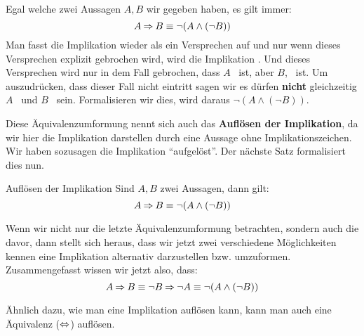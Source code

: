 \documentclass[../../main.tex]{subfiles}
\begin{document}
    Egal welche zwei Aussagen $A,B$ wir 
    gegeben haben, es gilt immer:
    \[A \mathbin{\Rightarrow} B \equiv \lnot (A \land (\lnot B))\] 
    Man fasst die Implikation wieder als 
    ein Versprechen auf und nur wenn dieses Versprechen explizit gebrochen wird,
     wird die Implikation \falsch. Und dieses Versprechen wird nur in dem Fall 
     gebrochen, dass $A$ \wahr\ ist, aber $B$, \falsch\  ist. Um auszudrücken, 
     dass dieser Fall nicht eintritt sagen wir es dürfen \textbf{nicht} gleichzeitig 
     $A$ \wahr\ und $B$ \falsch\ sein. Formalisieren wir dies, wird daraus 
     $\lnot (A \land (\lnot B))$.
    
    Diese Äquivalenzumformung nennt sich auch das \textbf{Auflösen der Implikation}, da wir hier die Implikation darstellen durch eine Aussage ohne Implikationszeichen. Wir haben sozusagen die Implikation \enquote{aufgelöst}. Der nächste Satz formalisiert dies nun.
    
    \begin{theorem}{Auflösen der Implikation}
        Sind $A,B$ zwei Aussagen, dann gilt:
        \[A \mathbin{\Rightarrow} B \equiv \lnot (A \land (\lnot B))\]
    \end{theorem}
    
    Wenn wir nicht nur die letzte Äquivalenzumformung betrachten, sondern auch die davor, 
    dann stellt sich heraus, 
    dass wir jetzt zwei verschiedene Möglichkeiten kennen eine Implikation alternativ 
    darzustellen bzw. umzuformen. Zusammengefasst wissen wir jetzt also, dass:
     \[A \mathbin{\Rightarrow} B \equiv \lnot B \mathbin{\Rightarrow} \lnot A \equiv \lnot (A \land (\lnot B))\]
    
    Ähnlich dazu, wie man eine Implikation auflösen kann, 
    kann man auch eine Äquivalenz ($\mathbin{\Leftrightarrow}$) auflösen.
\end{document}
